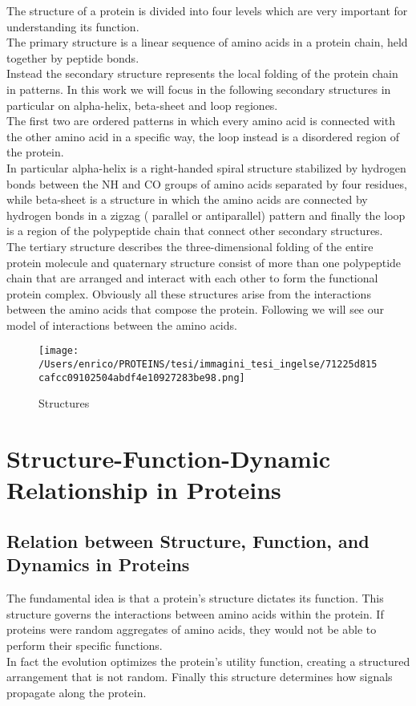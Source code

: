 \documentclass[English, Lau, oneside]{sapthesis}
\begin{document}
The structure of a protein is divided into four levels which are very important for understanding its function.\cite{ref4}\\
The primary structure is a linear sequence of amino acids in a protein chain, held together by peptide bonds.\\ 
Instead the secondary structure represents the local folding of the protein chain in patterns.
In this work we will focus in the following secondary structures in particular on alpha-helix, beta-sheet and loop regiones.\\ 
The first two are ordered patterns in which every amino acid is connected with the other amino acid in a specific way, the loop instead is a disordered region of the protein.\\
In particular alpha-helix is a right-handed spiral structure stabilized by hydrogen bonds between the NH and CO groups of amino acids separated by four residues, while beta-sheet is a structure in which the amino acids are connected by hydrogen bonds in a zigzag ( parallel or antiparallel) pattern
and finally the loop is a region of the polypeptide chain that connect other secondary structures.\\
The tertiary structure describes the three-dimensional folding of the entire protein molecule 
and quaternary structure consist of more than one polypeptide chain that are arranged and interact with each other to form the functional protein complex.
Obviously all these structures arise from the interactions between the amino acids that compose the protein. 
Following we will see our model of interactions between the amino acids.

\begin{figure}[H]
    \centering
    \texttt{[image: /Users/enrico/PROTEINS/tesi/immagini\_tesi\_ingelse/71225d815cafcc09102504abdf4e10927283be98.png]}
    \caption{Structures}
\end{figure}



\newpage

\chapter{Structure-Function-Dynamic Relationship in Proteins}

\section{Relation between Structure, Function, and Dynamics in Proteins}
\noindent The fundamental idea is that a protein's structure dictates its function. This structure governs the interactions between amino acids within the protein. If proteins were random aggregates of amino acids, they would not be able to perform their specific functions.\\
In fact the evolution optimizes the protein’s utility function, creating a structured arrangement that is not random.
Finally this structure determines how signals propagate along the protein.\\
\end{document}
